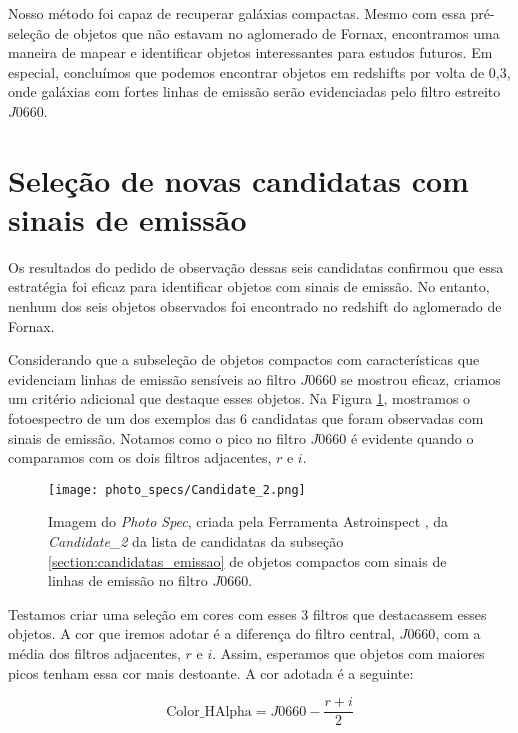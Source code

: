 Nosso método foi capaz de recuperar galáxias compactas. Mesmo com essa pré-seleção de objetos que não estavam no aglomerado de Fornax, encontramos uma maneira de mapear e identificar objetos interessantes para estudos futuros. Em especial, concluímos que podemos encontrar objetos em redshifts por volta de 0,3, onde galáxias com fortes linhas de emissão serão evidenciadas pelo filtro estreito $J0660$.

\section{Seleção de novas candidatas com sinais de emissão} \label{subsec:candidatas_emissao}
Os resultados do pedido de observação dessas seis candidatas confirmou que essa estratégia foi eficaz para identificar objetos com sinais de emissão. No entanto, nenhum dos seis objetos observados foi encontrado no redshift do aglomerado de Fornax.

Considerando que a subseleção de objetos compactos com características que evidenciam linhas de emissão sensíveis ao filtro $J0660$ se mostrou eficaz, criamos um critério adicional que destaque esses objetos. Na Figura \ref{ex_photospec_f600}, mostramos o fotoespectro de um dos exemplos das 6 candidatas que foram observadas com sinais de emissão. Notamos como o pico no filtro $J0660$ é evidente quando o comparamos com os dois filtros adjacentes, $r$ e $i$.

\begin{figure}[!ht]
    \begin{center}
    \texttt{[image: photo\_specs/Candidate\_2.png]}
    \caption[]{Imagem do \textit{Photo Spec}, criada pela Ferramenta Astroinspect \cite{astroinspect}, da \textit{Candidate\_2} da lista de candidatas da subseção \ref{section:candidatas_emissao} de objetos compactos com sinais de linhas de emissão no filtro $J0660$.}
    \label{ex_photospec_f600}
    \end{center}
\end{figure}

Testamos criar uma seleção em cores com esses 3 filtros que destacassem esses objetos. A cor que iremos adotar é a diferença do filtro central, $J0660$, com a média dos filtros adjacentes, $r$ e $i$. Assim, esperamos que objetos com maiores picos tenham essa cor mais destoante. A cor adotada é a seguinte:

\begin{equation}
    \text{Color\_HAlpha} = J0660 - \frac{r + i}{2}
    \label{equantion_halpha_color}
\end{equation}

